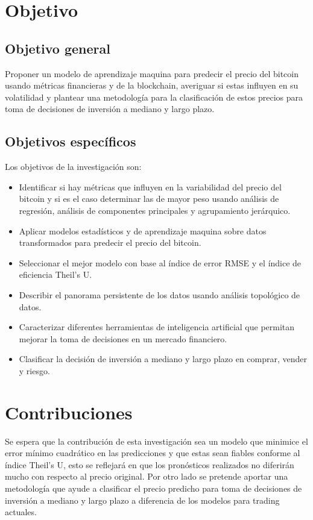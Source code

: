 \section{Objetivo}
\subsection{Objetivo general}
Proponer un modelo de aprendizaje maquina para predecir el precio del bitcoin usando métricas financieras y de la blockchain, averiguar si estas influyen en su volatilidad y %
plantear una metodología para la clasificación de estos precios para toma de decisiones de inversión a mediano y largo plazo.

\subsection{Objetivos específicos}
Los objetivos de la investigación son:
\begin{itemize}
	\item Identificar si hay métricas que influyen en la variabilidad del precio del bitcoin y si es el caso determinar las de mayor peso usando análisis de regresión, análisis de componentes principales y agrupamiento jerárquico.
	\item Aplicar modelos estadísticos y de aprendizaje maquina sobre datos transformados para predecir el precio del bitcoin.
	\item Seleccionar el mejor modelo con base al índice de error RMSE y el índice de eficiencia Theil's U.
	\item Describir el panorama persistente de los datos usando análisis topológico de datos.
	\item Caracterizar diferentes herramientas de inteligencia artificial que permitan mejorar la toma de decisiones en un mercado financiero.
	\item Clasificar la decisión de inversión a mediano y largo plazo en comprar, vender y riesgo.
\end{itemize}

\section{Contribuciones}
Se espera que la contribución de esta investigación sea un modelo que minimice el error mínimo cuadrático en las predicciones y que estas sean fiables conforme al índice Theil's U, esto se reflejará en que los pronósticos realizados no diferirán mucho con respecto al precio original.
Por otro lado se pretende aportar una metodología que ayude a clasificar el precio predicho para toma de decisiones de inversión
a mediano y largo plazo a diferencia de los modelos para trading actuales.
\vspace{-0.5cm}
